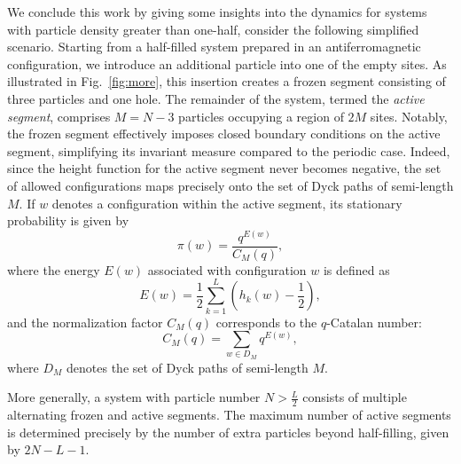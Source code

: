 \documentclass[pdflatex,sn-mathphys-num]{sn-jnl}
\theoremstyle{definition}
\theoremstyle{remark}
\numberwithin{equation}{section}
\begin{document}
We conclude this work by giving some insights into the dynamics for systems with particle density greater than one-half, consider the following simplified scenario. Starting from a half-filled system prepared in an antiferromagnetic configuration, we introduce an additional particle into one of the empty sites. As illustrated in Fig.~\ref{fig:more}, this insertion creates a frozen segment consisting of three particles and one hole. The remainder of the system, termed the \textit{active segment}, comprises $M = N - 3$ particles occupying a region of $2M$ sites. Notably, the frozen segment effectively imposes closed boundary conditions on the active segment, simplifying its invariant measure compared to the periodic case. Indeed, since the height function for the active segment never becomes negative, the set of allowed configurations maps precisely onto the set of Dyck paths of semi-length $M$.
If \( w \) denotes a configuration within the active segment, its stationary probability is given by
\begin{equation}
\pi(w) = \frac{q^{E(w)}}{C_{M}(q)},
\end{equation}
where the energy \( E(w) \) associated with configuration \( w \) is defined as
\begin{equation} 
E(w) = \frac{1}{2}\sum_{k=1}^{L}\left(h_k(w)-\frac{1}{2}\right),
\end{equation}
and the normalization factor \( C_{M}(q) \) corresponds to the \( q \)-Catalan number:
\begin{equation}
C_{M}(q) = \sum_{w \in D_{M}} q^{E(w)},
\end{equation}
where \( D_{M} \) denotes the set of Dyck paths of semi-length \( M \). 

More generally, a system with particle number \( N > \frac{L}{2} \) consists of multiple alternating frozen and active segments. The maximum number of active segments is determined precisely by the number of extra particles beyond half-filling, given by \( 2N - L - 1 \).
\end{document}
